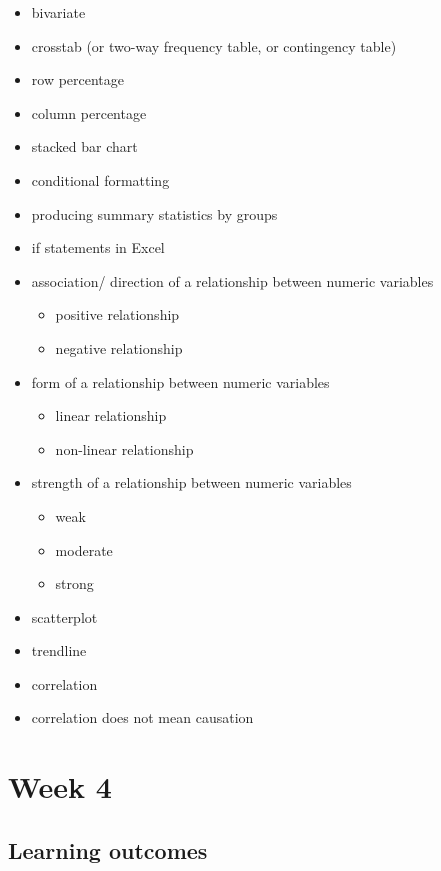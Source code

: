 \documentclass[
]{book}
\providecommand{\tightlist}{%
  \setlength{\itemsep}{0pt}\setlength{\parskip}{0pt}}
\begin{document}
\begin{itemize}
\tightlist
\item
  bivariate
\item
  crosstab (or two-way frequency table, or contingency table)
\item
  row percentage
\item
  column percentage
\item
  stacked bar chart
\item
  conditional formatting
\item
  producing summary statistics by groups
\item
  if statements in Excel
\item
  association/ direction of a relationship between numeric variables

  \begin{itemize}
  \tightlist
  \item
    positive relationship
  \item
    negative relationship
  \end{itemize}
\item
  form of a relationship between numeric variables

  \begin{itemize}
  \tightlist
  \item
    linear relationship
  \item
    non-linear relationship
  \end{itemize}
\item
  strength of a relationship between numeric variables

  \begin{itemize}
  \tightlist
  \item
    weak
  \item
    moderate
  \item
    strong
  \end{itemize}
\item
  scatterplot
\item
  trendline
\item
  correlation
\item
  correlation does not mean causation
\end{itemize}

\hypertarget{week4}{%
\chapter{Week 4}\label{week4}}

\hypertarget{learning-outcomes-3}{%
\section{Learning outcomes}\label{learning-outcomes-3}}
\end{document}
